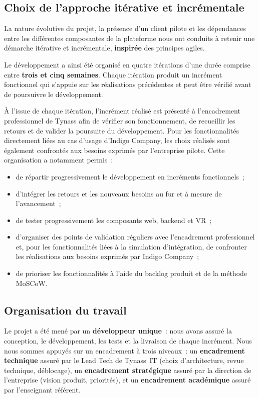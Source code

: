 \subsection{Choix de l'approche itérative et incrémentale}

La nature évolutive du projet, la présence d'un client pilote et les dépendances
entre les différentes composantes de la plateforme nous ont conduits à retenir une
démarche itérative et incrémentale, \textbf{inspirée} des principes agiles.

Le développement a ainsi été organisé en quatre itérations d'une durée comprise
entre \textbf{trois et cinq semaines}. Chaque itération produit un incrément fonctionnel
qui s'appuie sur les réalisations précédentes et peut être vérifié avant de poursuivre
le développement.

À l'issue de chaque itération, l'incrément réalisé est présenté à l'encadrement
professionnel de Tynass afin de vérifier son fonctionnement, de recueillir les retours
et de valider la poursuite du développement. Pour les fonctionnalités directement
liées au cas d'usage d'Indigo Company, les choix réalisés sont également confrontés
aux besoins exprimés par l'entreprise pilote.
\newpage
Cette organisation a notamment permis~:

\begin{itemize}
  \item de répartir progressivement le développement en incréments fonctionnels~;
  \item d'intégrer les retours et les nouveaux besoins au fur et à mesure de l'avancement~;
  \item de tester progressivement les composants web, backend et VR~;
  \item d'organiser des points de validation réguliers avec l'encadrement professionnel
        et, pour les fonctionnalités liées à la simulation d'intégration, de confronter
        les réalisations aux besoins exprimés par Indigo Company~;
  \item de prioriser les fonctionnalités à l'aide du backlog produit et de la méthode
        MoSCoW.
\end{itemize}

\subsection{Organisation du travail}

Le projet a été mené par un \textbf{développeur unique}~: nous avons assuré la conception, le
développement, les tests et la livraison de chaque incrément. Nous nous sommes appuyés
sur un encadrement à trois niveaux~: un \textbf{encadrement technique} assuré par le
Lead Tech de Tynass~IT (choix d'architecture, revue technique, déblocage), un
\textbf{encadrement stratégique} assuré par la direction de l'entreprise (vision
produit, priorités), et un \textbf{encadrement académique} assuré par l'enseignant
référent.


